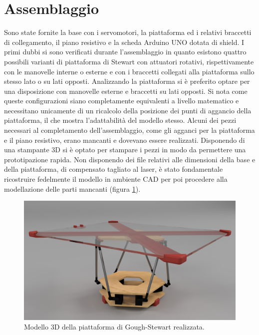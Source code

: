 \documentclass[12pt,twoside,openright]{report}
\begin{document}
\section{Assemblaggio}\label{assemblaggio}
Sono state fornite la base con i servomotori, la piattaforma ed i relativi braccetti di collegamento, il piano resistivo e la scheda Arduino UNO dotata di shield. I primi dubbi si sono verificati durante l'assemblaggio in quanto esistono quattro possibili varianti di piattaforma di Stewart con attuatori rotativi, rispettivamente con le manovelle interne o esterne e con i braccetti collegati alla piattaforma sullo stesso lato o su lati opposti. Analizzando la piattaforma si è preferito optare per una disposizione con manovelle esterne e braccetti su lati opposti. Si nota come queste configurazioni siano completamente equivalenti a livello matematico e necessitano unicamente di un ricalcolo della posizione dei punti di aggancio della piattaforma, il che mostra l'adattabilità del modello stesso. Alcuni dei pezzi necessari al completamento dell'assemblaggio, come gli agganci per la piattaforma e il piano resistivo, erano mancanti e dovevano essere realizzati. Disponendo di una stampante 3D si è optato per stampare i pezzi in modo da permettere una prototipazione rapida. Non disponendo dei file relativi alle dimensioni della base e della piattaforma, di compensato tagliato al laser, è stato fondamentale ricostruire fedelmente il modello in ambiente CAD per poi procedere alla modellazione delle parti mancanti (figura \ref{fig:renderstewart}). 
\begin{figure}[h!]
\centering
\includegraphics[width=\textwidth]{stewart.png}
\caption{Modello 3D della piattaforma di Gough-Stewart realizzata.} \label{fig:renderstewart}
\end{figure}
\end{document}
